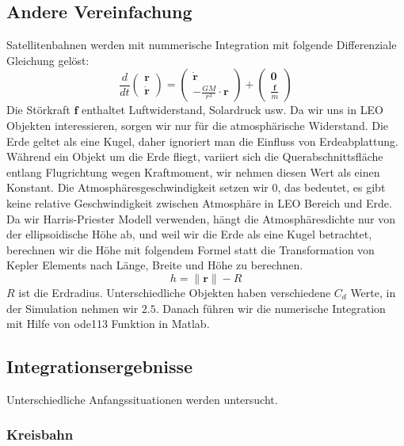 \documentclass{article}
\begin{document}
\subsection{Andere Vereinfachung}
Satellitenbahnen werden mit nummerische Integration mit folgende Differenziale Gleichung gelöst:
\begin{equation}
	\frac{d}{dt} \begin{pmatrix}
		\bm{r} \\
		\bm{\dot{r}}
	\end{pmatrix} = \begin{pmatrix}
	\bm{\dot{r}} \\
	- \frac{GM}{r^3} \cdot \bm{r}
\end{pmatrix} + \begin{pmatrix}
\bm{0} \\
\frac{\bm{f}}{m}
\end{pmatrix}
\end{equation}
Die Störkraft $\bm{f}$ enthaltet Luftwiderstand, Solardruck usw. Da wir uns in LEO Objekten interessieren, sorgen wir nur für die atmosphärische Widerstand. Die Erde geltet als eine Kugel, daher ignoriert man die Einfluss von Erdeabplattung. Während ein Objekt um die Erde fliegt, variiert sich die Querabschnittsfläche entlang Flugrichtung wegen Kraftmoment, wir nehmen diesen Wert als einen Konstant. Die Atmosphäresgeschwindigkeit setzen wir $0$, das bedeutet, es gibt keine relative Geschwindigkeit zwischen Atmosphäre in LEO Bereich und Erde. Da wir Harris-Priester Modell verwenden, hängt die Atmosphäresdichte nur von der ellipsoidische Höhe ab, und weil wir die Erde als eine Kugel betrachtet, berechnen wir die Höhe mit folgendem Formel statt die Transformation von Kepler Elements nach Länge, Breite und Höhe zu berechnen.
\begin{equation}
	h = \lVert \bm{r} \rVert - R
\end{equation}
$R$ ist die Erdradius. Unterschiedliche Objekten haben verschiedene $C_d$ Werte, in der Simulation nehmen wir $2.5$. Danach führen wir die numerische Integration mit Hilfe von ode113 Funktion in Matlab.
\clearpage
\subsection{Integrationsergebnisse}
Unterschiedliche Anfangssituationen werden untersucht.
\subsubsection{Kreisbahn}


\clearpage

\end{document}
